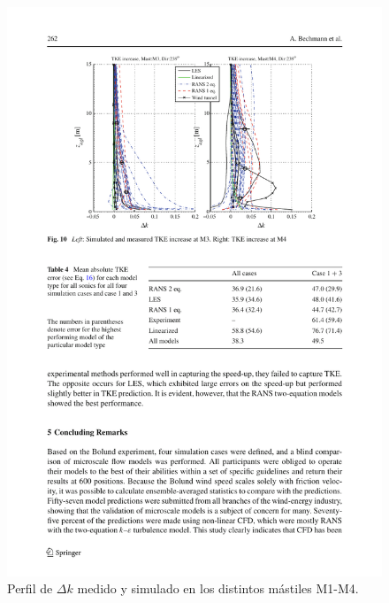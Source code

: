 \begin{figure}[H]
	\includegraphics[width=1\linewidth,trim={2.7cm 14.3cm 1.9cm 2cm},clip]{bolund5.pdf}%
	\caption{Perfil de $\Delta k$ medido y simulado en los distintos mástiles M1-M4.}
	\label{fig:an1_delta_tke_mast}
\end{figure}
